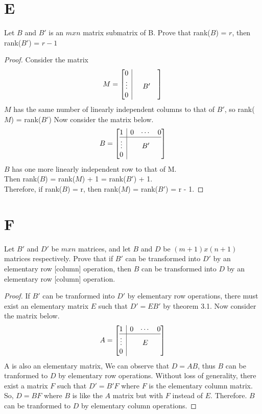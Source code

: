 \documentclass[11pt]{scrartcl}
\begin{document}
\section{E}
Let $B$ and $B'$ is an $mxn$ matrix submatrix of B. Prove that rank($B$) = $r$, then rank($B'$) = $r - 1$
\begin{proof}
Consider the matrix 
\[
M=
\left[\begin{array}{@{}c|ccc@{}}
0 & & & \\
\vdots & & B' & \\
0 & & &
\end{array}\right]	
\]
$M$ has the same number of linearly independent columns to that of $B'$, so rank($M$) = rank($B'$)
Now consider the matrix below.
\[
B=
\left[\begin{array}{@{}c|ccc@{}}
1 & 0 &\cdots &0 \\ \hline
\vdots & & B' & \\
0 & & &
\end{array}\right]	
\]
$B$ has one more linearly independent row to that of M.\\ Then rank($B$) = rank($M$) + 1 = rank($B'$) + 1.\\
Therefore, if rank($B$) = r, then rank($M$) = rank($B'$) = r - 1.
\end{proof}
	

\section{F}
Let $B'$ and $D'$ be $mxn$ matrices, and let $B$ and $D$ be $(m + 1)x(n + 1)$ matrices respectively. 
Prove that if $B'$ can be transformed into $D'$ by an elementary row [column] operation, then $B$ can be transformed
into $D$ by an elementary row [column] operation.
\begin{proof}
If $B'$ can be tranformed into $D'$ by elementary row operations, there must exist an elementary matrix $E$ 
such that $D'=EB'$ by theorem 3.1. Now consider the matrix below.
\[
A=
\left[\begin{array}{@{}c|ccc@{}}
1 & 0 &\cdots &0 \\ \hline
\vdots & & E & \\
0 & & &
\end{array}\right]	
\]
A is also an elementary matrix, 
We can observe that $D = AB$, thus $B$ can be tranformed to $D$ by elementary row operations.
Without loss of generality, there exist a matrix $F$ such that $D' = B'F$ where $F$ is the elementary column matrix.
So, $D = BF$ where $B$ is like the $A$ matrix but with $F$ instead of $E$. Therefore. $B$ can be tranformed
to $D$ by elementary column operations. 
\end{proof}
\end{document}
